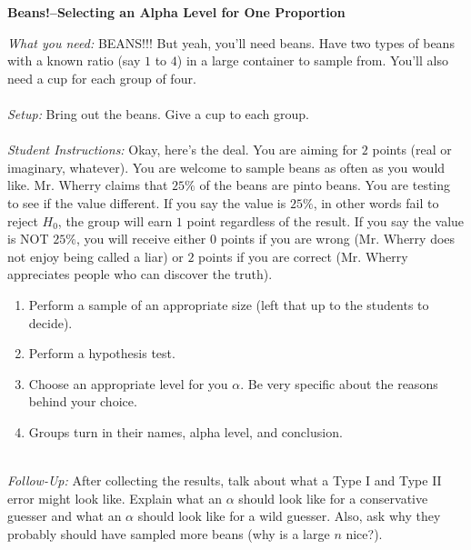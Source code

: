 \documentclass[12pt]{amsart}
\theoremstyle{definition}
\begin{document}
 \newpage
 
  \begin{framed}
  	\begin{center} \textbf{Beans!--Selecting an Alpha Level for One Proportion} \end{center}
  	\emph{What you need:} BEANS!!! But yeah, you'll need beans. Have two types of beans with a known ratio (say $1$ to $4$) in a large container to sample from. You'll also need a cup for each group of four.\\
  	~\\
  	\emph{Setup:} Bring out the beans. Give a cup to each group.\\
  	~\\
  	\emph{Student Instructions:} Okay, here's the deal. You are aiming for $2$ points (real or imaginary, whatever). You are welcome to sample beans as often as you would like. Mr. Wherry claims that $25\%$ of the beans are pinto beans. You are testing to see if the value different. If you say the value is $25\%$, in other words fail to reject $H_0$, the group will earn $1$ point regardless of the result. If you say the value is NOT $25\%$, you will receive either $0$ points if you are wrong (Mr. Wherry does not enjoy being called a liar) or $2$ points if you are correct (Mr. Wherry appreciates people who can discover the truth).
  	\begin{enumerate}
  		\item Perform a sample of an appropriate size (left that up to the students to decide).
  		\item Perform a hypothesis test. 
  		\item Choose an appropriate level for you $\alpha$. Be very specific about the reasons behind your choice.
  		\item Groups turn in their names, alpha level, and conclusion.
  	\end{enumerate}
  	~\\
  	\emph{Follow-Up:} After collecting the results, talk about what a Type I and Type II error might look like. Explain what an $\alpha$ should look like for a conservative guesser and what an $\alpha$ should look like for a wild guesser. Also, ask why they probably should have sampled more beans (why is a large $n$ nice?).
  \end{framed}
  
  \newpage
  
\end{document}
